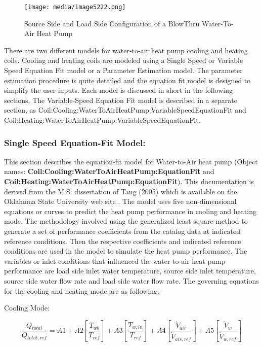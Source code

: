 \begin{figure}[hbtp] %
\centering
\texttt{[image: media/image5222.png]}
\caption{Source Side and Load Side Configuration of a BlowThru Water-To-Air Heat Pump \protect \label{fig:source-side-and-load-side-configuration-of-a}}
\end{figure}

There are two different models for water-to-air heat pump cooling and heating coils. Cooling and heating coils are modeled using a Single Speed or Variable Speed Equation Fit model or a Parameter Estimation model. The parameter estimation procedure is quite detailed and the equation fit model is designed to simplify the user inputs. Each model is discussed in short in the following sections. The Variable-Speed Equation Fit model is described in a separate section, as Coil:Cooling:WaterToAirHeatPump:VariableSpeedEquationFit and Coil:Heating:WaterToAirHeatPump:VariableSpeedEquationFit.

\subsubsection{Single Speed Equation-Fit Model:}\label{single-speed-equation-fit-model}

This section describes the equation-fit model for Water-to-Air heat pump (Object names: \textbf{Coil:Cooling:WaterToAirHeatPump:EquationFit} and \\ \textbf{Coil:Heating:WaterToAirHeatPump:EquationFit}). This documentation is derived from the M.S. dissertation of Tang (2005) which is available on the Oklahoma State University web site . The model uses five non-dimensional equations or curves to predict the heat pump performance in cooling and heating mode. The methodology involved using the generalized least square method to generate a set of performance coefficients from the catalog data at indicated reference conditions. Then the respective coefficients and indicated reference conditions are used in the model to simulate the heat pump performance. The variables or inlet conditions that influenced the water-to-air heat pump performance are load side inlet water temperature, source side inlet temperature, source side water flow rate and load side water flow rate. The governing equations for the cooling and heating mode are as following:

Cooling Mode:

\begin{equation}
\frac{{Q{}_{total}}}{{Q{}_{total,ref}}} = A1 + A2\left[ {\frac{{{T_{wb}}}}{{{T_{ref}}}}} \right] + A3\left[ {\frac{{T{}_{w,in}}}{{T{}_{ref}}}} \right] + A4\left[ {\frac{{{{\dot V}_{air}}}}{{{{\dot V}_{air,ref}}}}} \right] + A5\left[ {\frac{{{{\dot V}_w}}}{{{{\dot V}_{w,ref}}}}} \right]
\end{equation}

